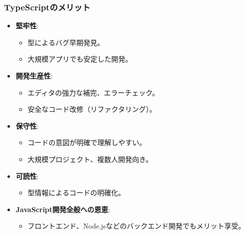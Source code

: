 \documentclass{beamer}
\begin{document}
\begin{frame}
    \frametitle{TypeScriptのメリット}
    \begin{itemize}
        \item \textbf{堅牢性}:
            \begin{itemize}
                \item 型によるバグ早期発見。
                \item 大規模アプリでも安定した開発。
            \end{itemize}
        \item \textbf{開発生産性}:
            \begin{itemize}
                \item エディタの強力な補完、エラーチェック。
                \item 安全なコード改修（リファクタリング）。
            \end{itemize}
        \item \textbf{保守性}:
            \begin{itemize}
                \item コードの意図が明確で理解しやすい。
                \item 大規模プロジェクト、複数人開発向き。
            \end{itemize}
        \item \textbf{可読性}:
            \begin{itemize}
                \item 型情報によるコードの明確化。
            \end{itemize}
        \item \textbf{JavaScript開発全般への恩恵}:
            \begin{itemize}
                \item フロントエンド、Node.jsなどのバックエンド開発でもメリット享受。
            \end{itemize}
    \end{itemize}
\end{frame}
\end{document}
